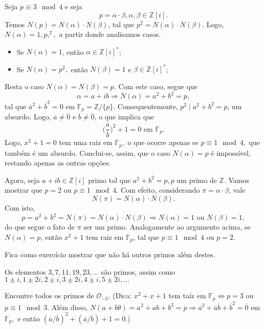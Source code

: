 \documentclass[algebraII_notes.tex]{subfiles}
\begin{document}
\begin{proof*}
	Seja \(p\equiv 3\mod 4\) e seja
	\[
		p = \alpha \cdot \beta , \alpha , \beta \in \mathbb{Z}[i].
	\]
	Temos \(N(p) = N(\alpha )\cdot N(\beta )\), tal que \(p^{2} = N(\alpha )\cdot N(\beta )\). Logo,
	\(N(\alpha ) = 1, p, ^{2},\) a partir donde analisamos casos.
	\begin{itemize}
		\item Se \(N(\alpha ) = 1\), então \(\alpha \in \mathbb{Z}[i]^{*}\);
		\item Se \(N(\alpha ) = p^{2},\) então \(N(\beta ) = 1\) e \(\beta \in \mathbb{Z}[i]^{*}\);
	\end{itemize}
	Resta o caso \(N(\alpha ) = N(\beta ) = p.\) Com este caso, segue que
	\[
		\alpha = a + ib \Rightarrow N(\alpha ) = a^{2} + b^{2} = p,
	\]
	tal que \(\overline{a}^{2} + \overline{b}^{2} = 0\) em \(\mathbb{F}_{p} = \mathbb{Z}/\{p\}\). Consequentemente,
	\(p^{2}\mid a^{2}+b^{2} = p\), um absurdo. Logo, \(\overline{a}\neq \overline{0}\) e \(\overline{b}\neq \overline{0}\), o que implica que
	\[
		\biggl(\frac{\overline{a}}{\overline{b}}\biggr)^{2} + 1 = 0 \text{ em } \mathbb{F}_{p}.
	\]
	Logo, \(x^{2} + 1 = 0\) tem uma raiz em \(\mathbb{F}_{p},\) o que ocorre apenas se \(p\equiv 1 \mod 4,\) que também
	é um absurdo. Conclui-se, assim, que o caso \(N(\alpha ) = p\) é impossível, restando apenas as outras opções.

	Agora, seja \(a+ib\in \mathbb{Z}[i]\) primo tal que \(a^{2} + b^{2} = p, p\) um primo de \(\mathbb{Z}.\)
	Vamos mostrar que \(p = 2\) ou \(p\equiv 1\mod 4\). Com efeito, considerando \(\pi  = \alpha \cdot \beta \), vale
	\[
		N(\pi ) = N(\alpha )\cdot N(\beta ).
	\]
	Com isto,
	\[
		p = a^{2} + b^{2} = N(\pi) = N(\alpha )\cdot N(\beta ) \Rightarrow N(\alpha ) = 1 \text{ ou } N(\beta ) = 1,
	\]
	do que segue o fato de \(\pi \) ser um primo. Analogamente ao argumento acima, se \(N(\alpha ) = p\), então \(x^{2} + 1\) tem raiz em \(\mathbb{F}_{p}\),
	tal que \(p\equiv 1 \mod 4\) ou \(p = 2\).

	Fica como exercício mostrar que não há outros primos além destes. \qedsymbol
\end{proof*}
\begin{example}
	Os elementos \(3, 7, 11, 19, 23, \dotsc\) são primos, assim como \(1\pm i, 1\pm 2i, 2\pm i, 3\pm 2i, 4\pm i, 5\pm 2i, \dotsc\)
\end{example}
\begin{example}[Exercício]
	Encontre todos os primos de \(\mathcal{O}_{-3}\). (Dica: \(x^{2}+x+1\) tem taíz em
	\(\mathbb{F}_{p} \Longleftrightarrow p = 3\) ou \(p\equiv 1\mod 3.\) Além disso, \(N(a + b\theta )
	= a^{2} + ab + b^{2} = p \Rightarrow \overline{a}^{2} + \overline{a}\overline{b} + \overline{b}^{2} = \overline{0}\)
	em \(\mathbb{F}_{p},\) e então \((\overline{a}/\overline{b})^{2} + (\overline{a}/\overline{b}) + 1 = \overline{0}.\))
\end{example}
\end{document}
